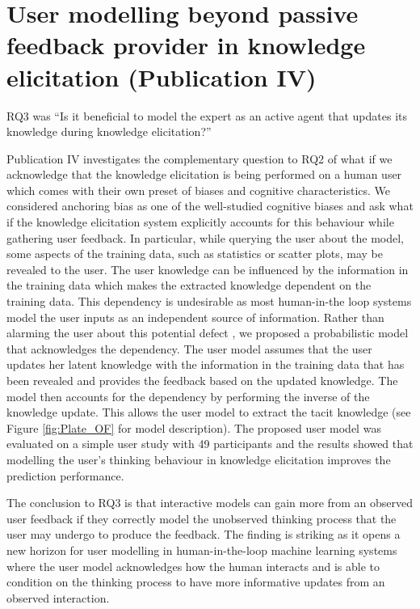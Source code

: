 \documentclass[dissertation,math,vertlayout,pdfa,colorlinks]{aaltoseries}
\begin{document}
\section{User modelling beyond passive feedback provider in knowledge elicitation (Publication IV)}

RQ3 was ``Is it beneficial to model the expert as an active agent that updates its knowledge during knowledge elicitation?''

Publication IV investigates the complementary question to RQ2 of what if we acknowledge that the knowledge elicitation is being performed on a human user which comes with their own preset of biases and cognitive characteristics. We considered anchoring bias as one of the well-studied cognitive biases \cite{Tversky1974} and ask what if the knowledge elicitation system explicitly accounts for this behaviour while gathering user feedback. In particular, while querying the user about the model, some aspects of the training data, such as statistics or scatter plots, may be revealed to the user. 
The user knowledge can be influenced by the information in the training data which makes the extracted knowledge dependent on the training data. This dependency is undesirable as most human-in-the loop systems model the user inputs as an independent source of information. Rather than alarming the user about this potential defect \cite{bias_warning}, we proposed a probabilistic model that acknowledges the dependency. The user model assumes that the user updates her latent knowledge with the information in the training data that has been revealed and provides the feedback based on the updated knowledge. The model then accounts for the dependency by performing the inverse of the knowledge update. This allows the user model to extract the tacit knowledge (see Figure \ref{fig:Plate_OF} for model description). The proposed user model was evaluated on a simple user study with 49 participants and the results showed that modelling the user's thinking behaviour in knowledge elicitation improves the prediction performance.

The conclusion to RQ3 is that interactive models can gain more from an observed user feedback if they correctly model the unobserved thinking process that the user may undergo to produce the feedback. The finding is striking as it opens a new horizon for user modelling in human-in-the-loop machine learning systems where the user model acknowledges how the human interacts and is able to condition on the thinking process to have more informative updates from an observed interaction.
\end{document}

